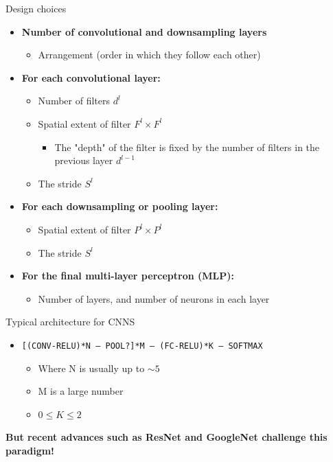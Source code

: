 \documentclass[default, aspectratio=169]{beamer}
\begin{document}
	\begin{frame}{Design choices}
		
		\begin{itemize}
			\item \textbf{Number of convolutional and downsampling layers}
			\begin{itemize}
				\item Arrangement (order in which they follow each other)
			\end{itemize}
			
			\item \textbf{For each convolutional layer:}
			\begin{itemize}
				\item Number of filters $d^l$
				\item Spatial extent of filter $F^l \times F^l$
				\begin{itemize}
					\item The "depth" of the filter is fixed by the number of filters in the previous layer $d^{l-1}$
				\end{itemize}
				\item The stride $S^l$
			\end{itemize}
			
			\item \textbf{For each downsampling or pooling layer:}
			\begin{itemize}
				\item Spatial extent of filter $P^l \times P^l$
				\item The stride $S^l$
			\end{itemize}
			
			\item \textbf{For the final multi-layer perceptron (MLP):}
			\begin{itemize}
				\item Number of layers, and number of neurons in each layer
			\end{itemize}
			
		\end{itemize}
		
	\end{frame}
	
	
	\begin{frame}{Typical architecture for CNNS}
		
		\begin{itemize}
			\item \texttt{[(CONV-RELU)*N – POOL?]*M – (FC-RELU)*K – SOFTMAX}
			\begin{itemize}
				\item Where N is usually up to $\sim 5$
				\item M is a large number
				\item $0 \leq K \leq 2$
			\end{itemize}
		\end{itemize}
		
		\bigskip
		
		\textbf{But recent advances such as ResNet and GoogleNet challenge this paradigm!}
		
	\end{frame}
	
\end{document}
